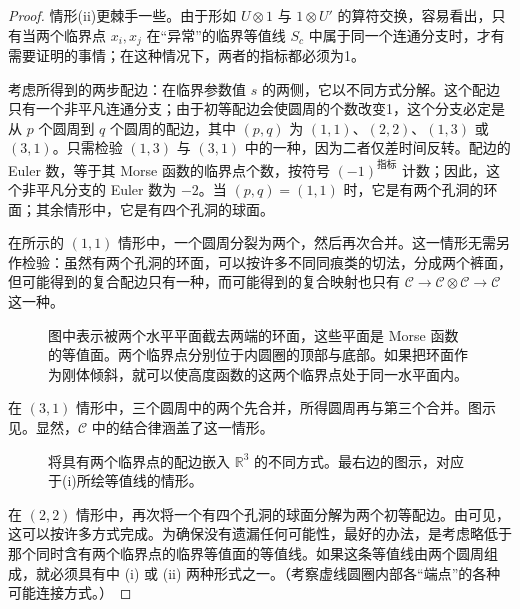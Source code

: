 \begin{proof}
情形(ii)更棘手一些。由于形如 $U\otimes1$ 与 $1\otimes U'$ 的算符交换，容易看出，只有当两个临界点 $x_i,x_j$ 在“异常”的临界等值线 $S_c$ 中属于同一个连通分支时，才有需要证明的事情；在这种情况下，两者的指标都必须为1。

考虑所得到的两步配边：在临界参数值 $s$ 的两侧，它以不同方式分解。这个配边只有一个非平凡连通分支；由于初等配边会使圆周的个数改变1，这个分支必定是从 $p$ 个圆周到 $q$ 个圆周的配边，其中 $(p,q)$ 为 $(1,1)$、$(2,2)$、$(1,3)$ 或 $(3,1)$。只需检验 $(1,3)$ 与 $(3,1)$ 中的一种，因为二者仅差时间反转。配边的 Euler 数，等于其 Morse 函数的临界点个数，按符号 $(-1)^{\text{指标}}$ 计数；因此，这个非平凡分支的 Euler 数为 $-2$。当 $(p,q)=(1,1)$ 时，它是有两个孔洞的环面；其余情形中，它是有四个孔洞的球面。

在所示的 $(1,1)$ 情形中，一个圆周分裂为两个，然后再次合并。这一情形无需另作检验：虽然有两个孔洞的环面，可以按许多不同同痕类的切法，分成两个裤面，但可能得到的复合配边只有一种，而可能得到的复合映射也只有 $\mathcal{C}\to\mathcal{C}\otimes\mathcal{C}\to\mathcal{C}$ 这一种。

\begin{figure}[H]
\centering
{}
\caption{图中表示被两个水平平面截去两端的环面，这些平面是 Morse 函数的等值面。两个临界点分别位于内圆圈的顶部与底部。如果把环面作为刚体倾斜，就可以使高度函数的这两个临界点处于同一水平面内。}\label{fig:2.32}
\end{figure}

在 $(3,1)$ 情形中，三个圆周中的两个先合并，所得圆周再与第三个合并。图示见。显然，$\mathcal{C}$ 中的结合律涵盖了这一情形。

\begin{figure}[H]
\centering
{}
\BookNumberOnlyCaption\label{fig:2.33}
\end{figure}

\begin{figure}[H]
\centering
{}
\caption{将具有两个临界点的配边嵌入 $\mathbb{R}^3$ 的不同方式。最右边的图示，对应于(i)所绘等值线的情形。}\label{fig:2.34}
\end{figure}

在 $(2,2)$ 情形中，再次将一个有四个孔洞的球面分解为两个初等配边。由可见，这可以按许多方式完成。为确保没有遗漏任何可能性，最好的办法，是考虑略低于那个同时含有两个临界点的临界等值面的等值线。如果这条等值线由两个圆周组成，就必须具有中 (i) 或 (ii) 两种形式之一。（考察虚线圆圈内部各“端点”的各种可能连接方式。）


\end{proof}

